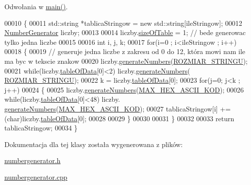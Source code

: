 Odwołania w \hyperlink{main_8cpp_source_l00018}{main()}.


\begin{DoxyCode}
00010                                                           \{
00011         std::string *tablicaStringow = \textcolor{keyword}{new} std::string[ileStringow];
00012         \hyperlink{class_number_generator}{NumberGenerator} liczby;
00013 
00014         liczby.\hyperlink{class_data_frame_aa5d1905c6910cad07ab5189bd34b13ab}{sizeOfTable} = 1; \textcolor{comment}{// bede generowac tylko jedna liczbe}
00015 
00016         \textcolor{keywordtype}{int} i, j, k;
00017         \textcolor{keywordflow}{for}(i=0 ; i<ileStringow ; i++)
00018         \{
00019                 \textcolor{comment}{// generuje jedna liczbe z zakresu od 0 do 12, która mowi nam ile ma byc w tekscie znakow}
00020                 liczby.\hyperlink{class_number_generator_a511673bb245d14a048702558d12deb63}{generateNumbers}(\hyperlink{numbergenerator_8h_aa387743f75779d7abf5cd4224af4cffa}{ROZMIAR\_STRINGU});
00021                 \textcolor{keywordflow}{while}(liczby.\hyperlink{class_data_frame_a8edc4ce524483e2e5069067267ccdcbf}{tableOfData}[0]<2) liczby.\hyperlink{class_number_generator_a511673bb245d14a048702558d12deb63}{generateNumbers}(
      \hyperlink{numbergenerator_8h_aa387743f75779d7abf5cd4224af4cffa}{ROZMIAR\_STRINGU});
00022                 k = liczby.\hyperlink{class_data_frame_a8edc4ce524483e2e5069067267ccdcbf}{tableOfData}[0];
00023                 \textcolor{keywordflow}{for}(j=0; j<k ; j++)
00024                 \{
00025                         liczby.\hyperlink{class_number_generator_a511673bb245d14a048702558d12deb63}{generateNumbers}(\hyperlink{numbergenerator_8h_ad234b171c744b5f476c1685da37bb7ca}{MAX\_HEX\_ASCII\_KOD});
00026                         \textcolor{keywordflow}{while}(liczby.\hyperlink{class_data_frame_a8edc4ce524483e2e5069067267ccdcbf}{tableOfData}[0]<48) liczby.
      \hyperlink{class_number_generator_a511673bb245d14a048702558d12deb63}{generateNumbers}(\hyperlink{numbergenerator_8h_ad234b171c744b5f476c1685da37bb7ca}{MAX\_HEX\_ASCII\_KOD});
00027                         tablicaStringow[i] += (char)liczby.\hyperlink{class_data_frame_a8edc4ce524483e2e5069067267ccdcbf}{tableOfData}[0];
00028 
00029                 \}
00030 
00031         \}
00032 
00033         \textcolor{keywordflow}{return} tablicaStringow;
00034 \}
\end{DoxyCode}


Dokumentacja dla tej klasy została wygenerowana z plików\-:\begin{DoxyCompactItemize}
\item 
\hyperlink{numbergenerator_8h}{numbergenerator.\-h}\item 
\hyperlink{numbergenerator_8cpp}{numbergenerator.\-cpp}\end{DoxyCompactItemize}
